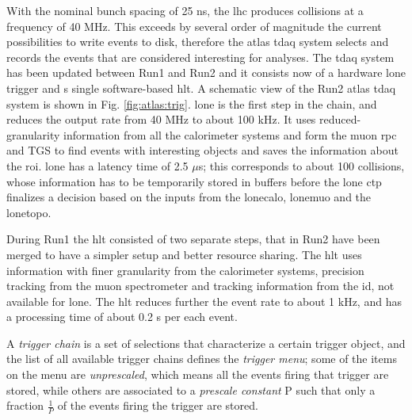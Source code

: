 With the nominal bunch spacing of 25 ns, the \gls{lhc} produces collisions at a frequency of 40 MHz. This exceeds by several order of magnitude the current possibilities to write events to disk, therefore the \gls{atlas} \gls{tdaq} system selects and records the events that are considered interesting for analyses. The \gls{tdaq} system has been updated between Run1 and Run2 \cite{Aaboud:2016leb} and it consists now of a  hardware \gls{lone} trigger and s single software-based \gls{hlt}. A schematic view of the Run2 \gls{atlas} \gls{tdaq} system is shown in Fig. \ref{fig:atlas:trig}. \gls{lone} is the first step in the chain, and reduces the output rate from 40 MHz to about 100 kHz. It uses reduced-granularity information from all the calorimeter systems and form the muon \gls{rpc} and TGS to find events with interesting objects and saves the information about the \gls{roi}. \gls{lone} has a latency time of 2.5 $\mu$s; this corresponds to about 100 collisions, whose information has to be temporarily stored in buffers before the \gls{lone} \gls{ctp} finalizes a decision based on the inputs from the \gls{lonecalo}, \gls{lonemuo} and the \gls{lonetopo}. 

During Run1 the \gls{hlt} consisted of two separate steps, that in Run2 have been merged to have a simpler setup and better resource sharing. The \gls{hlt} uses information with finer granularity from the calorimeter systems, precision tracking from the muon spectrometer and tracking information from the \gls{id}, not available for \gls{lone}. The \gls{hlt} reduces further the event rate to about 1 kHz, and has a processing time of about 0.2 s per each event. 

A \textit{trigger chain} is a set of selections that characterize a certain trigger object, and the list of all available trigger chains defines the \textit{trigger menu}; some of the items on the menu are \textit{unprescaled}, which means all the events firing that trigger are stored, while others are associated to a \textit{prescale constant} P such that only a fraction $\frac{1}{P}$ of the events firing the trigger are stored.

